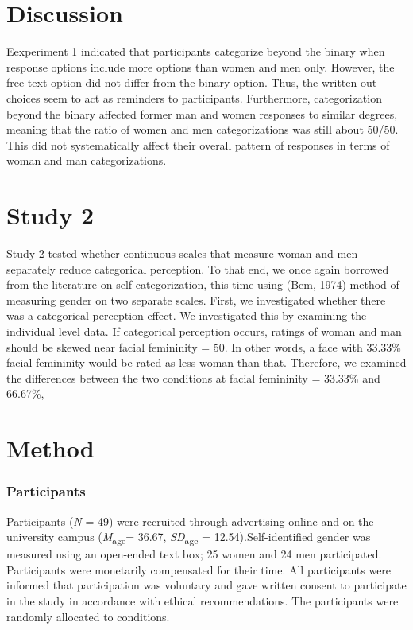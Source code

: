 \documentclass[
  man]{apa7}
\begin{document}
\hypertarget{discussion}{%
\section{Discussion}\label{discussion}}

Eexperiment 1 indicated that participants categorize beyond the binary when response options include more options than women and men only. However, the free text option did not differ from the binary option. Thus, the written out choices seem to act as reminders to participants. Furthermore, categorization beyond the binary affected former man and women responses to similar degrees, meaning that the ratio of women and men categorizations was still about 50/50. This did not systematically affect their overall pattern of responses in terms of woman and man categorizations.

\hypertarget{study-2}{%
\section{Study 2}\label{study-2}}

Study 2 tested whether continuous scales that measure woman and men separately reduce categorical perception. To that end, we once again borrowed from the literature on self-categorization, this time using (Bem, 1974) method of measuring gender on two separate scales. First, we investigated whether there was a categorical perception effect. We investigated this by examining the individual level data.
If categorical perception occurs, ratings of woman and man should be skewed near facial femininity = 50. In other words, a face with 33.33\% facial femininity would be rated as less woman than that. Therefore, we examined the differences between the two conditions at facial femininity = 33.33\% and 66.67\%,

\hypertarget{method-1}{%
\section{Method}\label{method-1}}

\hypertarget{participants-1}{%
\subsubsection{Participants}\label{participants-1}}

Participants (\emph{N} = 49) were recruited through advertising online and on the university campus (\emph{M}\textsubscript{age}= 36.67, \emph{SD}\textsubscript{age} = 12.54).Self-identified gender was measured using an open-ended text box; 25 women and 24 men participated. Participants were monetarily compensated for their time. All participants were informed that participation was voluntary and gave written consent to participate in the study in accordance with ethical recommendations. The participants were randomly allocated to conditions.
\end{document}

